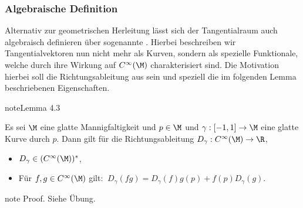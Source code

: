 \documentclass[letterpaper,10pt,german]{jupyterBook}
\begin{document}
\subsubsection{Algebraische Definition}
\label{\detokenize{manifolds/tangential:algebraische-definition}}
\sphinxAtStartPar
Alternativ zur geometrischen Herleitung lässt sich der Tangentialraum auch algebraisch definieren über sogenannte .
Hierbei beschreiben wir Tangentialvektoren nun nicht mehr als Kurven, sondern als spezielle Funktionale, welche durch ihre Wirkung auf \(C^\infty(\M)\) charakterisiert sind.
Die Motivation hierbei soll die Richtungsableitung aus {\hyperref[\detokenize{manifolds/tangential:def:direcdiv}]{}} sein und speziell die im folgenden Lemma beschriebenen Eigenschaften.
\label{manifolds/tangential:lemma-7}
\begin{sphinxadmonition}{note}{Lemma 4.3}



\sphinxAtStartPar
Es sei \(\M\) eine glatte Mannigfaltigkeit und \(p\in\M\) und \(\gamma:[-1,1]\to\M\) eine glatte Kurve durch \(p\).
Dann gilt für die Richtungsableitung \(D_\gamma:C^\infty(\M)\to\R\),
\begin{itemize}
\item {} 
\sphinxAtStartPar
\(D_\gamma\in (C^\infty(\M))^\ast\),

\item {} 
\sphinxAtStartPar
Für \(f,g\in C^\infty(\M)\) gilt: \(\ D_\gamma(fg) = D_\gamma(f) g(p) + f(p) D_\gamma(g)\).

\end{itemize}
\end{sphinxadmonition}

\begin{sphinxadmonition}{note}
\sphinxAtStartPar
Proof. Siehe Übung.
\end{sphinxadmonition}
\end{document}
